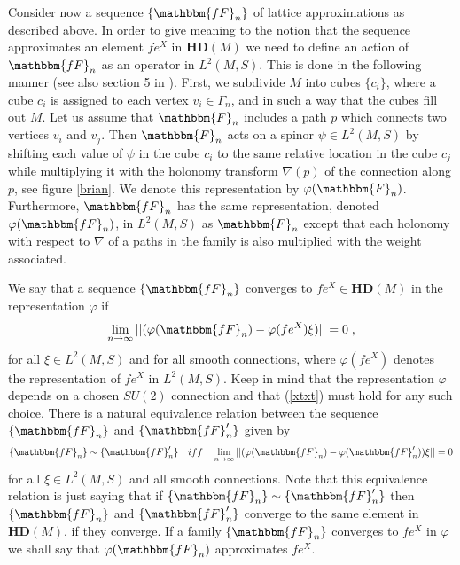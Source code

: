 \documentclass[12pt]{article}
\def\G{\Gamma}
\begin{document}
Consider now a sequence $\{\mathbbm{fF}_n\}$ of lattice approximations as described above. In order to give meaning to the notion that the sequence approximates  an element $f e^X$ in $\mathbf{HD}(M)$  we need to define an action of $\mathbbm{fF}_n$ as an operator in $L^2(M,S)$. This is done in the following manner (see also section 5 in \cite{Aastrup:2012vq}). First, we subdivide $M$ into cubes $\{c_i\}$, where a cube $c_i$ is assigned to each vertex $v_i\in\G_n$, and in such a way that the cubes fill out $M$. Let us assume that $\mathbbm{F}_n$ includes a path $p$ which connects two vertices $v_i$ and $v_j$. Then $\mathbbm{F}_n$ acts on a spinor $\psi\in L^2(M,S)$ by shifting each value of $\psi$ in the cube $c_i$ to the same relative location in the cube $c_j$ while multiplying it with the holonomy transform $\nabla(p)$ of the connection along $p$, see figure \ref{brian}. We denote this representation by $\varphi(\mathbbm{F}_n)$.
Furthermore, $\mathbbm{fF}_n$ has the same representation, denoted $\varphi(\mathbbm{fF}_n)$, in $L^2(M,S)$ as $\mathbbm{F}_n$ except that each holonomy with respect to $\nabla$ of a paths in the family is also multiplied with the weight associated.





We say that a sequence $\{\mathbbm{fF}_n\}$ converges to $f e^X\in \mathbf{HD}(M) $ in the representation $\varphi$ if
\begin{equation}
\lim_{n\rightarrow\infty}\vert\vert (\varphi(\mathbbm{fF}_n) - \varphi(fe^X)\xi) \vert\vert = 0\;,
\label{xtxt}
\end{equation}
for all $\xi\in L^2(M,S)$ and for all smooth connections,
where $\varphi(fe^X)$ denotes the representation of $fe^X$ in $L^2(M,S)$. Keep in mind that the representation $\varphi$ depends on a chosen $SU(2)$ connection and that (\ref{xtxt}) must hold for any such choice.
There is a natural equivalence relation between the sequence $\{\mathbbm{fF}_n\}$ and $\{\mathbbm{fF}'_n\}$ given by
\begin{equation}
\{\mathbbm{fF}_n\}\sim \{\mathbbm{fF}_n'\}\quad iff \quad \lim_{n\rightarrow\infty}\vert\vert ({\varphi(\mathbbm{fF}_n)} - \varphi(\mathbbm{fF}_n'))\xi \vert\vert = 0
\label{xtxtx}
\end{equation}
for all $\xi\in L^2(M,S)$ and all smooth connections. Note that this equivalence relation is just saying that if $\{\mathbbm{fF}_n\}\sim \{\mathbbm{fF}_n'\}$ then $\{\mathbbm{fF}_n\}$ and $\{\mathbbm{fF}_n'\}$ converge to the same element in  $\mathbf{HD}(M)$, if they converge. 
If a family $\{\mathbbm{fF}_n\}$ converges to $fe^X$ in $\varphi$ we 
shall say that  $\varphi(\mathbbm{fF}_n)$ approximates $fe^X$.
\end{document}
